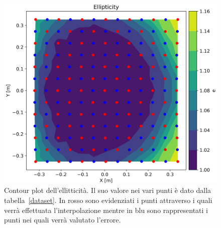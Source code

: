 \documentclass[12pt,a4paper,final]{book}
\begin{document}
\begin{figure}[!ht]
	\centering
	\includegraphics[scale=0.6]{../figures/ContourPlot_e.png}
	\caption{Contour plot dell'ellitticità. Il suo valore nei vari punti è dato dalla tabella~\ref{dataset}. In rosso sono evidenziati i punti attraverso i quali verrà effettuata l'interpolazione mentre in blu sono rappresentati i punti nei quali verrà valutato l'errore.}
	\label{cplot_e}
\end{figure}

\end{document}
